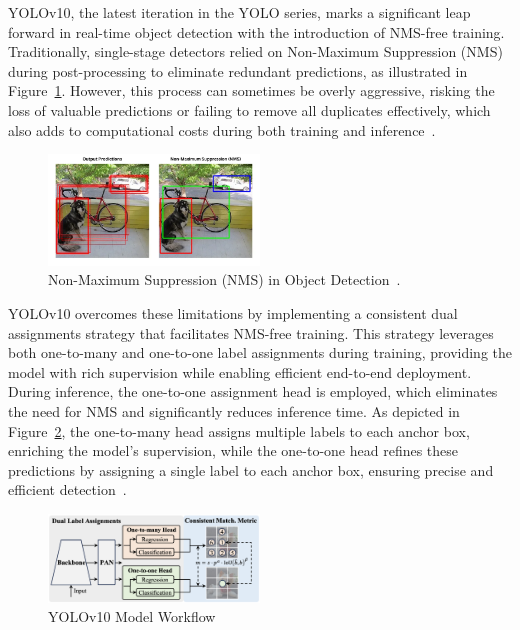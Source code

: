 \documentclass[12pt,oneside]{book} %
\begin{document}
YOLOv10, the latest iteration in the YOLO series, marks a significant leap
forward in real-time object detection with the introduction of NMS-free
training. Traditionally, single-stage detectors relied on Non-Maximum
Suppression (NMS) during post-processing to eliminate redundant predictions, as
illustrated in Figure~\ref{fig:nms}. However, this process can sometimes be
overly aggressive, risking the loss of valuable predictions or failing to
remove all duplicates effectively, which also adds to computational costs
during both training and inference~\cite{LearnOpenCVYOLOv10}.

\begin{figure}[H]
    \centering
    \includegraphics[width=0.5\textwidth]{figures/NMS.png}
    \caption{Non-Maximum Suppression (NMS) in Object Detection~\cite{LearnOpenCVYOLOv10}.}\label{fig:nms}
\end{figure}

\noindent YOLOv10 overcomes these limitations by implementing a consistent dual
assignments strategy that facilitates NMS-free training. This strategy
leverages both one-to-many and one-to-one label assignments during training,
providing the model with rich supervision while enabling efficient end-to-end
deployment. During inference, the one-to-one assignment head is employed, which
eliminates the need for NMS and significantly reduces inference time. As
depicted in Figure~\ref{fig:yolov10}, the one-to-many head assigns multiple
labels to each anchor box, enriching the model’s supervision, while the
one-to-one head refines these predictions by assigning a single label to each
anchor box, ensuring precise and efficient detection~\cite{wang2024yolov10}.

\begin{figure}[H]
    \centering
    \includegraphics[width=0.5\textwidth]{figures/YOLOV10.png}
    \caption{YOLOv10 Model Workflow~\cite{wang2024yolov10}}\label{fig:yolov10}
\end{figure}
\end{document}
